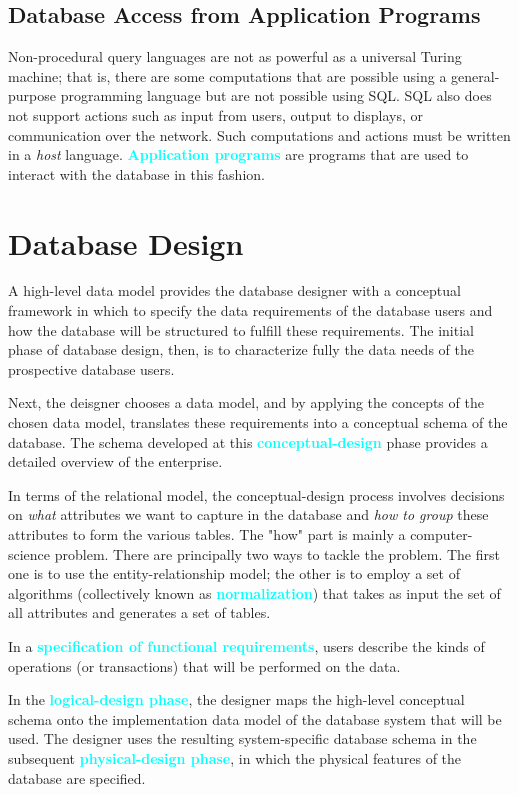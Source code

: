 \documentclass[a4paper,12pt,twoside,openany]{book}
\newcommand{\textcy}[1]{\textbf{\textcolor{cyan}{#1}}}
\begin{document}
\subsection{Database Access from Application Programs}

Non-procedural query languages are not as powerful as a universal Turing machine; that is, there are some computations that are possible using a general-purpose programming language but are not possible using SQL. SQL also does not support actions such as input from users, output to displays, or communication over the network. Such computations and actions must be written in a \textit{host} language. \textcy{Application programs} are programs that are used to interact with the database in this fashion.

\section{Database Design}

A high-level data model provides the database designer with a conceptual framework in which to specify the data requirements of the database users and how the database will be structured to fulfill these requirements. The initial phase of database design, then, is to characterize fully the data needs of the prospective database users.

Next, the deisgner chooses a data model, and by applying the concepts of the chosen data model, translates these requirements into a conceptual schema of the database. The schema developed at this \textcy{conceptual-design} phase provides a detailed overview of the enterprise.

In terms of the relational model, the conceptual-design process involves decisions on \textit{what} attributes we want to capture in the database and \textit{how to group} these attributes to form the various tables. The "how" part is mainly a computer-science problem. There are principally two ways to tackle the problem. The first one is to use the entity-relationship model; the other is to employ a set of algorithms (collectively known as \textcy{normalization}) that takes as input the set of all attributes and generates a set of tables.

In a \textcy{specification of functional requirements}, users describe the kinds of operations (or transactions) that will be performed on the data.

In the \textcy{logical-design phase}, the designer maps the high-level conceptual schema onto the implementation data model of the database system that will be used. The designer uses the resulting system-specific database schema in the subsequent \textcy{physical-design phase}, in which the physical features of the database are specified.
\end{document}
